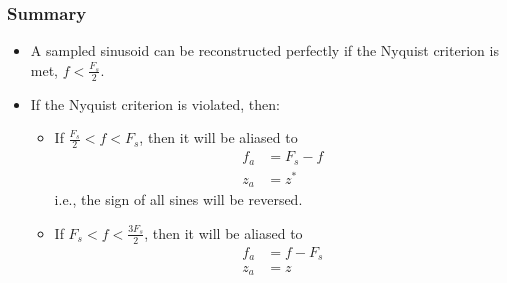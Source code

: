 \documentclass{beamer}
\begin{document}
\begin{frame}
  \frametitle{Summary}

  \begin{itemize}
  \item A sampled sinusoid can be reconstructed perfectly if the
    Nyquist criterion is met, $f < \frac{F_s}{2}$.
  \item If the Nyquist criterion is violated, then:
    \begin{itemize}
    \item If $\frac{F_s}{2}<f<F_s$, then it will be aliased to
      \begin{align*}
        f_a &= F_s-f\\
        z_a &= z^*
      \end{align*}
      i.e., the sign of all sines will be reversed.
    \item If $F_s < f < \frac{3F_s}{2}$, then it will be aliased to
      \begin{align*}
        f_a &= f-F_s\\
        z_a &= z
      \end{align*}
    \end{itemize}
  \end{itemize}
\end{frame}
\end{document}
